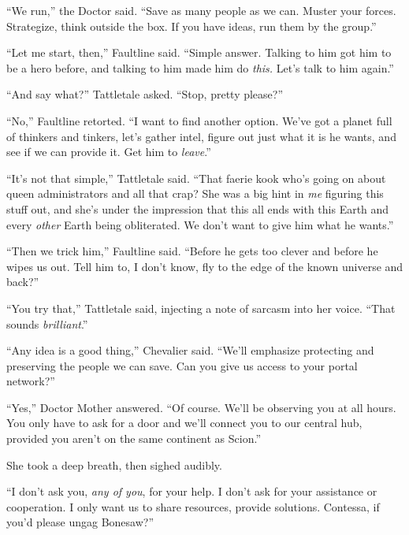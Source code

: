 ``We run,'' the Doctor said.  ``Save as many people as we can.  Muster your forces.  Strategize, think outside the box.  If you have ideas, run them by the group.''



``Let me start, then,'' Faultline said.  ``Simple answer.  Talking to him got him to be a hero before, and talking to him made him do \emph{this.  }Let's talk to him again.''



``And say what?''  Tattletale asked.  ``Stop, pretty please?''



``No,'' Faultline retorted.  ``I want to find another option.  We've got a planet full of thinkers and tinkers, let's gather intel, figure out just what it is he wants, and see if we can provide it.  Get him to \emph{leave}.''



``It's not that simple,'' Tattletale said.  ``That faerie kook who's going on about queen administrators and all that crap?  She was a big hint in \emph{me} figuring this stuff out, and she's under the impression that this all ends with this Earth and every \emph{other} Earth being obliterated.  We don't want to give him what he wants.''



``Then we trick him,'' Faultline said.  ``Before he gets too clever and before he wipes us out.  Tell him to, I don't know, fly to the edge of the known universe and back?''



``You try that,'' Tattletale said, injecting a note of sarcasm into her voice.  ``That sounds \emph{brilliant}.''



``Any idea is a good thing,'' Chevalier said.  ``We'll emphasize protecting and preserving the people we can save.  Can you give us access to your portal network?''



``Yes,'' Doctor Mother answered.  ``Of course.  We'll be observing you at all hours.  You only have to ask for a door and we'll connect you to our central hub, provided you aren't on the same continent as Scion.''



She took a deep breath, then sighed audibly.



``I don't ask you, \emph{any of you}, for your help.  I don't ask for your assistance or cooperation.  I only want us to share resources, provide solutions.  Contessa, if you'd please ungag Bonesaw?''



